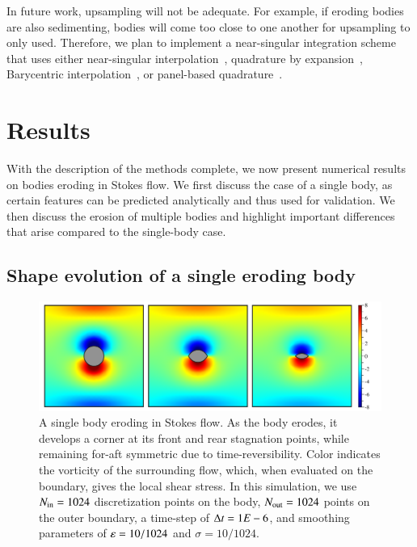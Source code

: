 \documentclass[preprint, 10pt]{elsarticle}
\begin{document}
In future work, upsampling will not be adequate.  For example, if
eroding bodies are also sedimenting, bodies will come too close to one
another for upsampling to only used.  Therefore, we plan to implement a
near-singular integration scheme that uses either near-singular
interpolation~\cite{qua-bir2014a}, quadrature by
expansion~\cite{klo-bar-gre-one2013}, Barycentric
interpolation~\cite{bar-wu-vee2015}, or panel-based
quadrature~\cite{hel-oja2008a}.





\section{Results}
\label{s:results}
With the description of the methods complete, we now present numerical
results on bodies eroding in Stokes flow. We first discuss the case of a
single body, as certain features can be predicted analytically and thus
used for validation. We then discuss the erosion of multiple bodies and
highlight important differences that arise compared to the single-body
case.

\subsection{Shape evolution of a single eroding body}

\begin{figure}%
\begin{center}
\includegraphics[width = 0.80 \textwidth]{./figs/01bodseq.pdf}
\caption{\label{01bodseq} A single body eroding in Stokes flow. As the
body erodes, it develops a corner at its front and rear stagnation
points, while remaining for-aft symmetric due to time-reversibility.
Color indicates the vorticity of the surrounding flow, which, when
evaluated on the boundary, gives the local shear stress. In this
simulation, we use $N_{\mathrm{in}} = 1024$ discretization points on the body,
$N_{\mathrm{out}} = 1024$ points on the outer boundary, a time-step of $\Delta t =
1E-6$, and smoothing parameters of $\varepsilon = 10/1024$ and $\sigma =
10/1024$.}
\end{center}
\end{figure}
\end{document}
